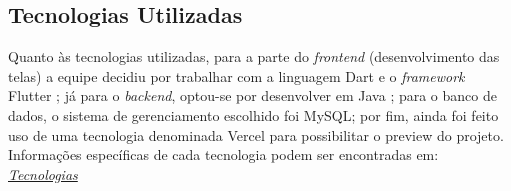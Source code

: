 \subsection{Tecnologias Utilizadas}
Quanto às tecnologias utilizadas, para a parte do \textit{frontend} (desenvolvimento das telas) a equipe decidiu por trabalhar com a linguagem Dart \cite{Dart} e o \textit{framework} Flutter \cite{Flutter}; já para o \textit{backend}, optou-se por desenvolver em Java \cite{Java}; para o banco de dados, o sistema de gerenciamento escolhido foi MySQL; por fim, ainda foi feito uso de uma tecnologia denominada Vercel \cite{Vercel} para possibilitar o preview do projeto. Informações específicas de cada tecnologia podem ser encontradas em: 
\href{https://tools.ages.pucrs.br/o-turismo-rural-em-s-o-francisco-de-paula/wiki/-/wikis/arquitetura#tecnologias}{\textit{Tecnologias}}

